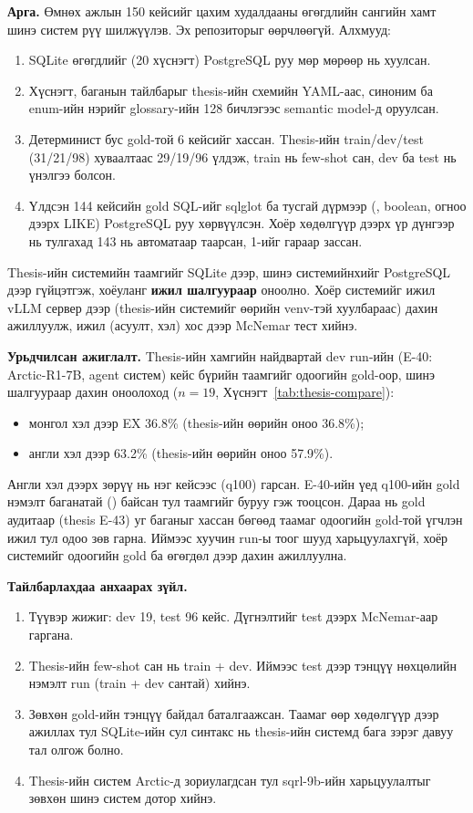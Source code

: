 \textbf{Арга.} Өмнөх ажлын 150 кейсийг цахим худалдааны өгөгдлийн сангийн хамт шинэ систем рүү шилжүүлэв. Эх
репозиторыг өөрчлөөгүй. Алхмууд:
\begin{enumerate}
  \item SQLite өгөгдлийг (20 хүснэгт) PostgreSQL руу мөр мөрөөр нь хуулсан.
  \item Хүснэгт, баганын тайлбарыг thesis-ийн схемийн YAML-аас, синоним ба enum-ийн нэрийг glossary-ийн 128 бичлэгээс
        semantic model-д оруулсан.
  \item Детерминист бус gold-той 6 кейсийг хассан. Thesis-ийн train/dev/test (31/21/98) хуваалтаас 29/19/96 үлдэж,
        train нь few-shot сан, dev ба test нь үнэлгээ болсон.
  \item Үлдсэн 144 кейсийн gold SQL-ийг sqlglot ба тусгай дүрмээр (, boolean, огноо дээрх LIKE)
        PostgreSQL руу хөрвүүлсэн. Хоёр хөдөлгүүр дээрх үр дүнгээр нь тулгахад 143 нь автоматаар таарсан, 1-ийг гараар
        зассан.
\end{enumerate}
Thesis-ийн системийн таамгийг SQLite дээр, шинэ системийнхийг PostgreSQL дээр гүйцэтгэж, хоёуланг \textbf{ижил
шалгуураар} оноолно. Хоёр системийг ижил vLLM сервер дээр (thesis-ийн системийг өөрийн venv-тэй хуулбараас) дахин
ажиллуулж, ижил (асуулт, хэл) хос дээр McNemar тест хийнэ.

\textbf{Урьдчилсан ажиглалт.} Thesis-ийн хамгийн найдвартай dev run-ийн (E-40: Arctic-R1-7B, agent систем) кейс бүрийн
таамгийг одоогийн gold-оор, шинэ шалгуураар дахин оноолоход ($n = 19$, Хүснэгт~\ref{tab:thesis-compare}):
\begin{itemize}
  \item монгол хэл дээр EX 36.8\% (thesis-ийн өөрийн оноо 36.8\%);
  \item англи хэл дээр 63.2\% (thesis-ийн өөрийн оноо 57.9\%).
\end{itemize}
Англи хэл дээрх зөрүү нь нэг кейсээс (q100) гарсан. E-40-ийн үед q100-ийн gold нэмэлт баганатай ()
байсан тул таамгийг буруу гэж тооцсон. Дараа нь gold аудитаар (thesis E-43) уг баганыг хассан бөгөөд таамаг одоогийн
gold-той үгчлэн ижил тул одоо зөв гарна. Иймээс хуучин run-ы тоог шууд харьцуулахгүй, хоёр системийг одоогийн gold ба
өгөгдөл дээр дахин ажиллуулна.



\textbf{Тайлбарлахдаа анхаарах зүйл.}
\begin{enumerate}
  \item Түүвэр жижиг: dev 19, test 96 кейс. Дүгнэлтийг test дээрх McNemar-аар гаргана.
  \item Thesis-ийн few-shot сан нь train + dev. Иймээс test дээр тэнцүү нөхцөлийн нэмэлт run (train + dev сантай) хийнэ.
  \item Зөвхөн gold-ийн тэнцүү байдал баталгаажсан. Таамаг өөр хөдөлгүүр дээр ажиллах тул SQLite-ийн сул синтакс нь
        thesis-ийн системд бага зэрэг давуу тал олгож болно.
  \item Thesis-ийн систем Arctic-д зориулагдсан тул sqrl-9b-ийн харьцуулалтыг зөвхөн шинэ систем дотор хийнэ.
\end{enumerate}

